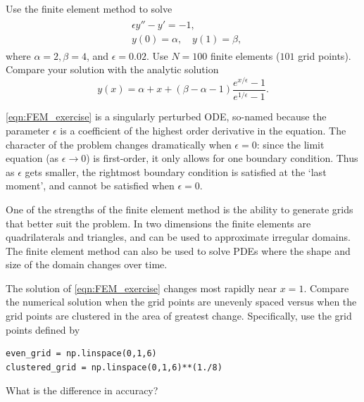 \begin{problem}
Use the finite element method to solve
\begin{align}
	\begin{split}
	&{ }\epsilon y'' - y' = -1,\\
	&{ }y(0) = \alpha, \quad y(1) = \beta,
	\end{split} \label{eqn:FEM_exercise}
\end{align}
where $\alpha = 2, \beta = 4$, and $\epsilon = 0.02$.  Use $N = 100$ finite elements ($101$ grid points).
Compare your solution with the analytic solution
\[y(x) = \alpha + x + (\beta - \alpha - 1 ) \frac{e^{x/\epsilon} -1}{e^{1/\epsilon} -1}.\]

\eqref{eqn:FEM_exercise} is a singularly perturbed ODE, so-named because the parameter $\epsilon$ is a coefficient of the highest order derivative in the equation.
The character of the problem changes dramatically when $\epsilon = 0$: since the limit equation (as $\epsilon \to 0$) is first-order, it only allows for one boundary condition.
Thus as $\epsilon$ gets smaller, the rightmost boundary condition is satisfied at the `last moment',  and cannot be satisfied when $\epsilon = 0$.
\end{problem}

\begin{problem}
One of the strengths of the finite element method is the ability to generate grids that better suit the problem.
In two dimensions the finite elements are quadrilaterals and triangles, and can be used to approximate irregular domains.
The finite element method can also be used to solve PDEs where the shape and size of the domain changes over time.

The solution of \eqref{eqn:FEM_exercise} changes most rapidly near $x = 1$.
Compare the numerical solution when the grid points are unevenly spaced versus when the grid points are clustered in the area of greatest change. Specifically, use the grid points defined by
\begin{lstlisting}
even_grid = np.linspace(0,1,6)
clustered_grid = np.linspace(0,1,6)**(1./8)
\end{lstlisting}
What is the difference in accuracy?
\end{problem}


